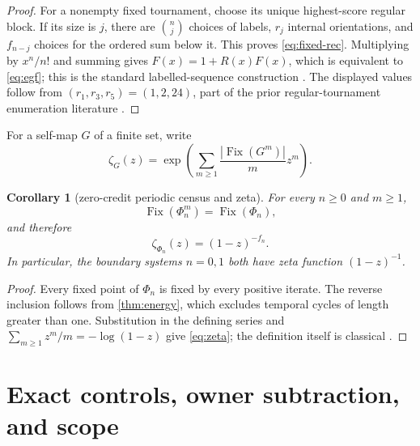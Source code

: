 \documentclass[11pt,a4paper]{amsart}
\newtheorem{corollary}[theorem]{Corollary}
\theoremstyle{definition}
\theoremstyle{remark}
\newcommand{\Fix}{\operatorname{Fix}}
\begin{document}
\begin{proof}
For a nonempty fixed tournament, choose its unique highest-score regular
block.  If its size is $j$, there are $\binom nj$ choices of labels,
$r_j$ internal orientations, and $f_{n-j}$ choices for the ordered sum
below it.  This proves \eqref{eq:fixed-rec}.  Multiplying by $x^n/n!$ and
summing gives $F(x)=1+R(x)F(x)$, which is equivalent to
\eqref{eq:egf}; this is the standard labelled-sequence construction
\cite{FlajoletSedgewick2009}.  The displayed values follow from
$(r_1,r_3,r_5)=(1,2,24)$, part of the prior regular-tournament enumeration
literature \cite{McKay1990}.
\end{proof}

For a self-map $G$ of a finite set, write
\[
 \zeta_G(z)=\exp\left(\sum_{m\geq1}
                \frac{|\Fix(G^m)|}{m}z^m\right).
\]

\begin{corollary}[zero-credit periodic census and zeta]\label{cor:zeta}
For every $n\geq0$ and $m\geq1$,
\[
             \Fix(\Phi_n^m)=\Fix(\Phi_n),
\]
and therefore
\begin{equation}\label{eq:zeta}
                 \boxed{\zeta_{\Phi_n}(z)=(1-z)^{-f_n}.}
\end{equation}
In particular, the boundary systems $n=0,1$ both have zeta function
$(1-z)^{-1}$.
\end{corollary}

\begin{proof}
Every fixed point of $\Phi_n$ is fixed by every positive iterate.  The
reverse inclusion follows from \cref{thm:energy}, which excludes temporal
cycles of length greater than one.  Substitution in the defining series and
$\sum_{m\geq1}z^m/m=-\log(1-z)$ give \eqref{eq:zeta}; the definition itself
is classical \cite{ArtinMazur1965}.
\end{proof}

\section{Exact controls, owner subtraction, and scope}\label{sec:controls}
\end{document}
